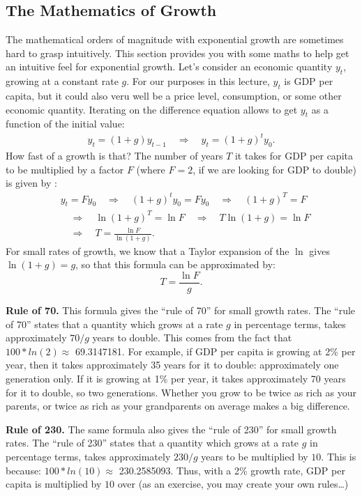 \documentclass[]{book}
\theoremstyle{definition}
\theoremstyle{definition}
\theoremstyle{definition}
\theoremstyle{remark}
\begin{document}
\subsection{The Mathematics of Growth}\label{the-mathematics-of-growth}

The mathematical orders of magnitude with exponential growth are
sometimes hard to grasp intuitively. This section provides you with some
maths to help get an intuitive feel for exponential growth. Let's
consider an economic quantity \(y_t\), growing at a constant rate \(g\).
For our purposes in this lecture, \(y_t\) is GDP per capita, but it
could also veru well be a price level, consumption, or some other
economic quantity. Iterating on the difference equation allows to get
\(y_t\) as a function of the initial value: \[
\begin{aligned}
y_t = (1+g)y_{t-1} \quad \Rightarrow \quad y_t = (1+g)^t y_0.
\end{aligned}
\] How fast of a growth is that? The number of years \(T\) it takes for
GDP per capita to be multiplied by a factor \(F\) (where \(F=2\), if we
are looking for GDP to double) is given by : \[
\begin{aligned}
&y_t = F y_0 \quad \Rightarrow \quad (1+g)^t y_0 = F y_0 \quad \Rightarrow \quad (1+g)^T = F \\
& \quad \Rightarrow \quad \ln (1+g)^T = \ln F \quad \Rightarrow \quad T \ln (1+g) = \ln F \\
& \quad \Rightarrow \quad T=\frac{\ln F}{\ln(1+g)}.
\end{aligned}
\] For small rates of growth, we know that a Taylor expansion of the
\(\ln\) gives \(\ln(1+g)=g\), so that this formula can be approximated
by: \[T = \frac{\ln F}{g}.\]

\textbf{Rule of 70.} This formula gives the ``rule of 70'' for small
growth rates. The ``rule of 70'' states that a quantity which grows at a
rate \(g\) in percentage terms, takes approximately \(70/g\) years to
double. This comes from the fact that \(100*ln(2) \approx\) 69.3147181.
For example, if GDP per capita is growing at 2\% per year, then it takes
approximately 35 years for it to double: approximately one generation
only. If it is growing at 1\% per year, it takes approximately 70 years
for it to double, so two generations. Whether you grow to be twice as
rich as your parents, or twice as rich as your grandparents on average
makes a big difference.

\textbf{Rule of 230.} The same formula also gives the ``rule of 230''
for small growth rates. The ``rule of 230'' states that a quantity which
grows at a rate \(g\) in percentage terms, takes approximately \(230/g\)
years to be multiplied by \(10\). This is because:
\(100*ln(10) \approx\) 230.2585093. Thus, with a 2\% growth rate, GDP
per capita is multiplied by \(10\) over (as an exercise, you may create
your own rules\ldots{})
\end{document}
